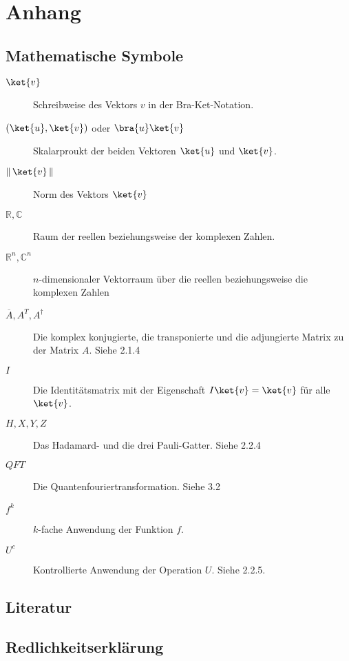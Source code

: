 \chapter{Anhang}
\section{Mathematische Symbole}
\begin{description}
    \item[$\ket{v}$] Schreibweise des Vektors $v$ in der Bra-Ket-Notation.
    \item[$(\ket{u}, \ket{v})$ oder $\bra{u}\ket{v}$] Skalarproukt der beiden Vektoren $\ket{u}$ und $\ket{v}$.
    \item[$\left\|\, \ket{v}\, \right\|$] Norm des Vektors $\ket{v}$
    \item[$\mathbb{R}, \mathbb{C}$] Raum der reellen beziehungsweise der komplexen Zahlen.
    \item[$\mathbb{R}^n, \mathbb{C}^n$] $n$-dimensionaler Vektorraum über die reellen beziehungsweise die komplexen Zahlen
    \item[$\overline{A}, A^T, A^\dagger$] Die komplex konjugierte, die transponierte und die adjungierte Matrix zu der Matrix $A$. Siehe 2.1.4
    \item[$I$] Die Identitätsmatrix mit der Eigenschaft $I\ket{v} = \ket{v}$ für alle $\ket{v}$. 
    \item[$H, X, Y, Z$] Das Hadamard- und die drei Pauli-Gatter. Siehe 2.2.4
    \item[$QFT$] Die Quantenfouriertransformation. Siehe 3.2
    \item[$f^k$] $k$-fache Anwendung der Funktion $f$.
    \item[$U^c$] Kontrollierte Anwendung der Operation $U$. Siehe 2.2.5.
\end{description}

\section{Literatur}
\printbibliography

\section{Redlichkeitserklärung}
